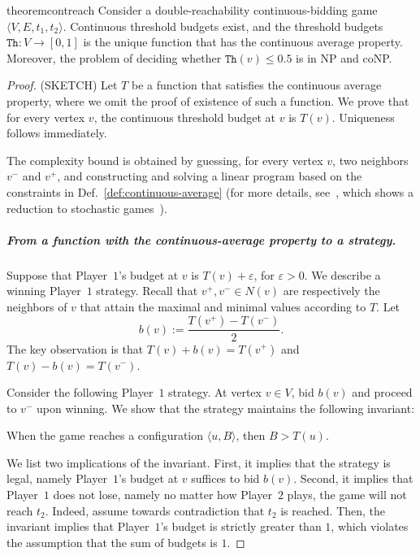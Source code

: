 \documentclass{article}\providecommand{\nequiv}{\not\equiv}\usepackage[a4paper,margin=20mm]{geometry}
\newcommand{\PO}{Player~$1$\xspace}
\newcommand{\PT}{Player~$2$\xspace}
\newcommand{\thresh}{\texttt{Th}\xspace}
\newcommand{\zug}[1]{\langle #1  \rangle}
\newcommand{\eps}{\varepsilon}
\begin{document}
\begin{restatable}{theorem}{contreach}
\label{thm:cont-reach}
\cite{LLPU96,LLPSU99}
Consider a double-reachability continuous-bidding game $\zug{V, E, t_1, t_2}$. Continuous threshold budgets exist, and the threshold budgets $\thresh: V \rightarrow [0,1]$ is the unique function that has the continuous average property. Moreover, the problem of deciding whether $\thresh(v) \leq 0.5$ is in NP and coNP.
\end{restatable}
\begin{proof}
(SKETCH)
Let $T$ be a function that satisfies the continuous average property, where we omit the proof of existence of such a function. We prove that for every vertex $v$, the continuous threshold budget at $v$ is $T(v)$. Uniqueness follows immediately. 

The complexity bound is obtained by guessing, for every vertex $v$, two neighbors $v^-$ and $v^+$, and constructing and solving a linear program based on the constraints in Def.~\ref{def:continuous-average} (for more details, see~\cite{AHC19}, which shows a reduction to stochastic games~\cite{Con92}). 

\subparagraph*{From a function with the continuous-average property to a strategy.}
Suppose that \PO's budget at $v$ is $T(v) + \eps$, for $\eps > 0$. We describe a winning \PO strategy. 
Recall that $v^+, v^- \in N(v)$ are respectively the neighbors of $v$ that attain the maximal and minimal values according to $T$. Let 
\[b(v) := \frac{T(v^+) - T(v^-)}{2}.\]
The key observation is that $T(v) + b(v) = T(v^+)$ and $T(v)-b(v) = T(v^-)$.

Consider the following \PO strategy. At vertex $v \in V$, bid $b(v)$ and proceed to $v^-$ upon winning. We show that the strategy maintains the following invariant:

When the game reaches a configuration $\zug{u, B}$, then $B > T(u)$. 

We list two implications of the invariant. First, it implies that the strategy is legal, namely \PO's budget at $v$ suffices to bid $b(v)$. 
Second, it implies that \PO does not lose, namely no matter how \PT plays, the game will not reach $t_2$. Indeed, assume towards contradiction that $t_2$ is reached. Then, the invariant implies that \PO's budget is strictly greater than $1$, which violates the assumption that the sum of budgets is $1$.


\end{proof}
\end{document}
